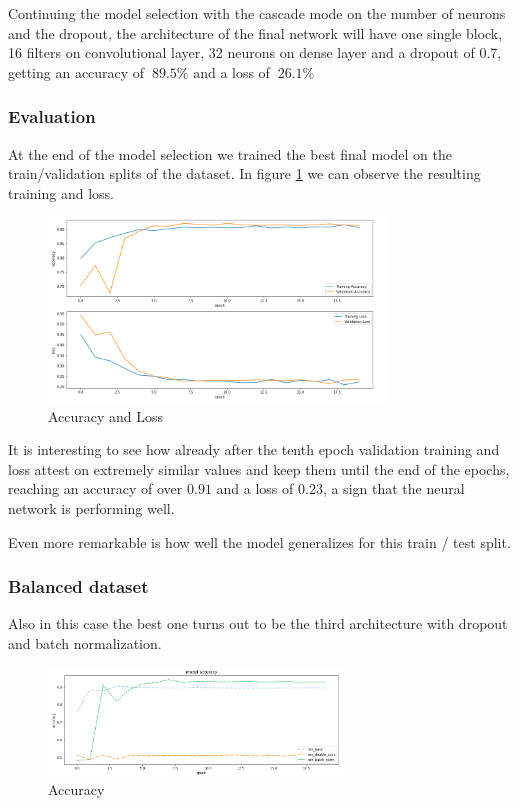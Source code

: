 \documentclass{article}
\begin{document}
Continuing the model selection with the cascade mode on the number of neurons and the dropout, the architecture of the final network will have one single block, 16 filters on convolutional layer, 32 neurons on dense layer and a dropout of 0.7, getting an accuracy of $~89.5\%$ and a loss of $~26.1\%$

\subsubsection{Evaluation}
At the end of the model selection we trained the best final model on the train/validation splits of the dataset.
In figure \ref{fig:acc_loss_unb} we can observe the resulting training and loss.

\begin{figure}[h]
    \centering
    \includegraphics[width=0.8\textwidth]{images/validation_unbalance.png}
    \caption{Accuracy and Loss}
    \label{fig:acc_loss_unb}
\end{figure}

It is interesting to see how already after the tenth epoch validation training and loss attest on extremely similar values and keep them until the end of the epochs, reaching an accuracy of over $0.91$ and a loss of $0.23$, a sign that the neural network is performing well.

Even more remarkable is how well the model generalizes for this train / test split.

\subsubsection{Balanced dataset}
Also in this case the best one turns out to be the third architecture with dropout and batch normalization.

\begin{figure}[H]
    \centering
    \includegraphics[width=0.7\textwidth]{images/accuracy_balance.png}
    \caption{Accuracy}
    \label{fig:acc_bal}
\end{figure}
\end{document}
